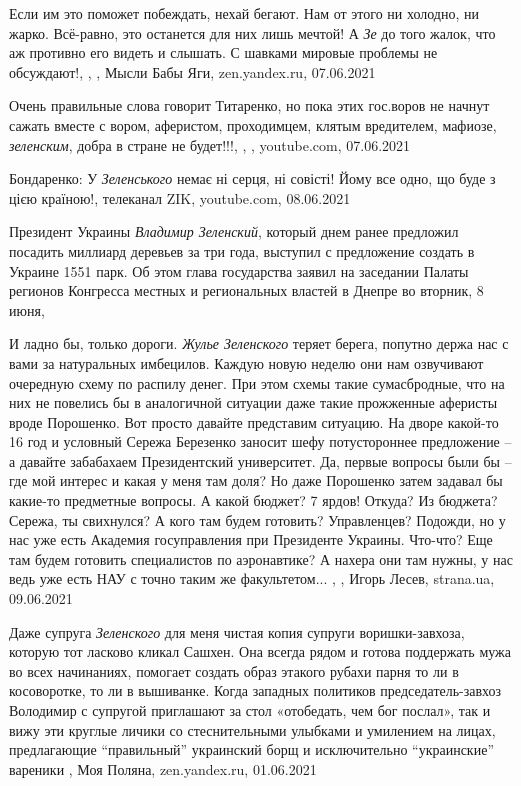Если им это поможет побеждать, нехай бегают. Нам от этого ни холодно, ни жарко.
Всё-равно, это останется для них лишь мечтой!  А \emph{Зе} до того жалок, что аж
противно его видеть и слышать. С шавками мировые проблемы не обсуждают!,
,
, Мысли Бабы Яги, zen.yandex.ru, 07.06.2021

Очень правильные слова говорит Титаренко, но пока этих гос.воров не начнут
сажать вместе с  вором, аферистом, проходимцем, клятым вредителем, мафиозе,
\emph{зеленским}, добра в стране не будет!!!,
, 
,
youtube.com, 07.06.2021

Бондаренко: У \emph{Зеленського} немає ні серця, ні совісті! Йому все одно, що буде з цією країною!,
телеканал ZIK, youtube.com, 08.06.2021

Президент Украины \emph{Владимир Зеленский}, который днем ранее предложил посадить
миллиард деревьев за три года, выступил с предложение создать в Украине 1551
парк. Об этом глава государства заявил на заседании Палаты регионов Конгресса
местных и региональных властей в Днепре во вторник, 8 июня,

И ладно бы, только дороги. \emph{Жулье Зеленского} теряет берега, попутно держа нас с
вами за натуральных имбецилов. Каждую новую неделю они нам озвучивают очередную
схему по распилу денег. При этом схемы такие сумасбродные, что на них не
повелись бы в аналогичной ситуации даже такие прожженные аферисты вроде
Порошенко.  Вот просто давайте представим ситуацию. На дворе какой-то 16 год и
условный Сережа Березенко заносит шефу потустороннее предложение – а давайте
забабахаем Президентский университет. Да, первые вопросы были бы – где мой
интерес и какая у меня там доля? Но даже Порошенко затем задавал бы какие-то
предметные вопросы. А какой бюджет? 7 ярдов! Откуда? Из бюджета? Сережа, ты
свихнулся? А кого там будем готовить? Управленцев? Подожди, но у нас уже есть
Академия госуправления при Президенте Украины. Что-что? Еще там будем готовить
специалистов по аэронавтике? А нахера они там нужны, у нас ведь уже есть НАУ с
точно таким же факультетом... ,
, Игорь Лесев, strana.ua, 09.06.2021

Даже супруга \emph{Зеленского} для меня чистая копия супруги воришки-завхоза, которую
тот ласково кликал Сашхен. Она всегда рядом и готова поддержать мужа во всех
начинаниях, помогает создать образ этакого рубахи парня то ли в косоворотке, то
ли в вышиванке. Когда западных политиков председатель-завхоз Володимир с
супругой приглашают за стол «отобедать, чем бог послал», так и вижу эти круглые
личики со стеснительными улыбками и умилением на лицах, предлагающие
\enquote{правильный} украинский борщ и исключительно \enquote{украинские} вареники
, Моя Поляна, zen.yandex.ru, 01.06.2021


